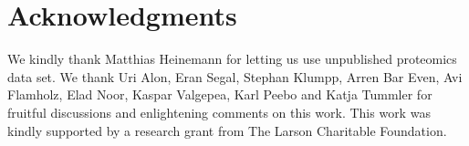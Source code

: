\section{Acknowledgments}
We kindly thank Matthias Heinemann for letting us use unpublished proteomics data set.
We thank Uri Alon,  Eran Segal, Stephan Klumpp, Arren Bar Even, Avi Flamholz, Elad Noor, Kaspar Valgepea, Karl Peebo and Katja Tummler for fruitful discussions and enlightening comments on this work.
This work was kindly supported by a research grant from The Larson Charitable Foundation.